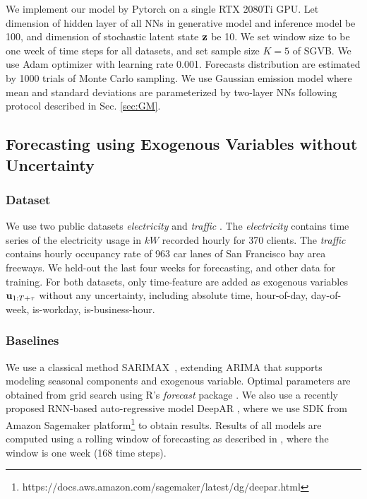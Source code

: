 \documentclass{article}
\begin{document}
We implement our model by Pytorch on a single RTX 2080Ti GPU. Let dimension of hidden layer of all NNs in generative model and inference model be 100, and dimension of stochastic latent state $\mathbf{z}$ be 10. We set window size to be one week of time steps for all datasets, and set sample size $K=5$ of SGVB. We use Adam optimizer \cite{kingma2014adam} with learning rate 0.001. Forecasts distribution are estimated by 1000 trials of Monte Carlo sampling. We use Gaussian emission model where mean and standard deviations are parameterized by two-layer NNs following protocol described in Sec. \ref{sec:GM}.

\subsection{Forecasting using Exogenous Variables without Uncertainty}
\subsubsection{Dataset} We use two public datasets \textit{electricity} and \textit{traffic} \cite{yu2016temporal}. The \textit{electricity} contains time series of the electricity usage in $kW$ recorded hourly for 370 clients. The \textit{traffic} contains hourly occupancy rate of 963 car lanes of San Francisco bay area freeways. We held-out the last four weeks for forecasting, and other data for training. For both datasets, only time-feature are added as exogenous variables $\mathbf{u}_{1:T+\tau}$ without any uncertainty, including absolute time, hour-of-day, day-of-week, is-workday, is-business-hour.

\subsubsection{Baselines} We use a classical method SARIMAX~\cite{box2015time}, extending ARIMA that supports modeling seasonal components and exogenous variable. Optimal parameters are obtained from grid search using R's \textit{forecast} package \cite{hyndman2007automatic}. We also use a recently proposed RNN-based auto-regressive model DeepAR \cite{flunkert2017deepar}, where we use SDK from Amazon Sagemaker platform\footnote{https://docs.aws.amazon.com/sagemaker/latest/dg/deepar.html} to obtain results. Results of all models are computed using a rolling window of forecasting as described in \cite{yu2016temporal}, where the window is one week (168 time steps). 
\end{document}
